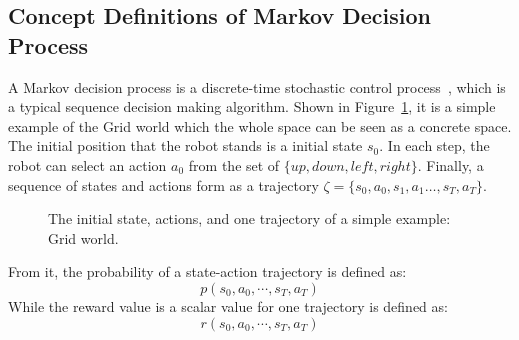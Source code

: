 \documentclass[11pt]{article}
\begin{document}
\subsection{Concept Definitions of Markov Decision Process}
A Markov decision process is a discrete-time stochastic control process~\cite{puterman1990markov}, which is a typical sequence decision making algorithm. Shown in Figure~\ref{fig:1}, it is a simple example of the Grid world which the whole space can be seen as a concrete space. The initial position that the robot stands is a initial state $s_0$. In each step, the robot can select an action $a_0$ from the set of $\{up, down, left, right\}$. Finally, a sequence of states and actions form as a trajectory $\zeta = \{ s_0, a_0, s_1, a_1 \dots, s_T, a_T \}$.
\begin{figure}[H]
    \centering
    
    \caption{The initial state, actions, and one trajectory of a simple example: Grid world.}
    \label{fig:1}
\end{figure}

From it, the probability of a state-action trajectory is defined as:
$$p\left(s_{0}, a_{0}, \cdots, s_{T}, a_{T}\right)$$
While the reward value is a scalar value for one trajectory is defined as:
$$r\left(s_{0}, a_{0}, \cdots, s_{T}, a_{T}\right)$$
\end{document}
